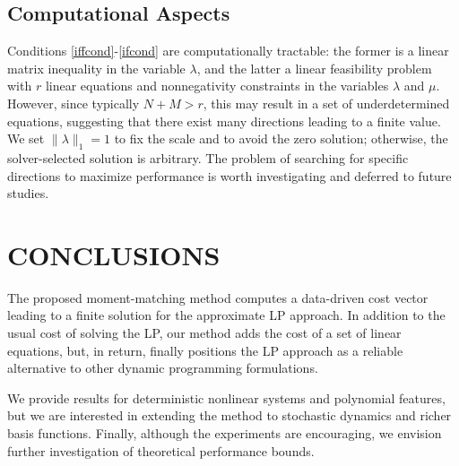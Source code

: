 \documentclass[journal,twoside,web]{ieeecolor}
\begin{document}
\subsection{Computational Aspects}

Conditions \eqref{iffcond}-\eqref{ifcond} are computationally tractable: the former is a linear matrix inequality in the variable $\lambda$, and the latter a linear feasibility problem with $r$ linear equations and nonnegativity constraints in the variables $\lambda$ and $\mu$. However, since typically $N+M>r$, this may result in a set of underdetermined equations, suggesting that there exist many directions leading to a finite value. We set $\|\lambda\|_1 = 1$ to fix the scale and to avoid the zero solution; otherwise, the solver-selected solution is arbitrary. The problem of searching for specific directions to maximize performance is worth investigating and deferred to future studies.



\section{CONCLUSIONS}

The proposed moment-matching method computes a data-driven cost vector leading to a finite solution for the approximate LP approach. In addition to the usual cost of solving the LP, our method adds the cost of a set of linear equations, but, in return, finally positions the LP approach as a reliable alternative to other dynamic programming formulations.

We provide results for deterministic nonlinear systems and polynomial features, but we are interested in extending the method to stochastic dynamics and richer basis functions. Finally, although the experiments are encouraging, we envision further investigation of theoretical performance bounds.





\end{document}
